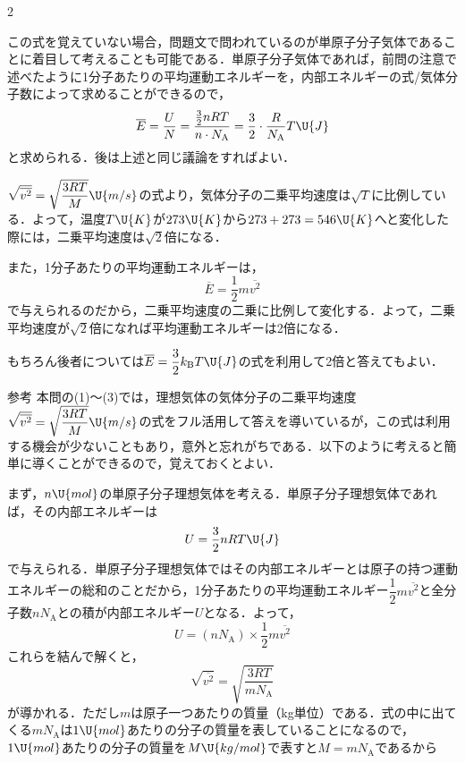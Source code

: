 \begin{multicols}{2}
\begin{bekkai}
\hspace*{1zw}この式を覚えていない場合，問題文で問われているのが単原子分子気体であることに着目して考えることも可能である．単原子分子気体であれば，前問の注意で述べたように1分子あたりの平均運動エネルギーを，内部エネルギーの式/気体分子数によって求めることができるので，
\[\overline{E}=\frac{U}{N}=\frac{\frac{3}{2}nRT}{n\cdot N_{\mathrm{A}}}=\frac{3}{2}\cdot\frac{R}{N_{\mathrm{A}}}T\U{J}\]
と求められる．後は上述と同じ議論をすればよい．
\end{bekkai}
\begin{komon}
 $\sqrt{\overline{v^2}}=\sqrt{\dfrac{3RT}{M}}\U{m/s}$の式より，気体分子の二乗平均速度は$\sqrt{T}$に比例している．よって，温度$T\U{K}$が$273\U{K}$から$273+273=546\U{K}$へと変化した際には，二乗平均速度は$\sqrt{2}$倍になる．\Ans\par
       \hspace*{1zw}また，1分子あたりの平均運動エネルギーは，
       \[\overline{E}=\frac{1}{2}m\overline{v^2}\]
       で与えられるのだから，二乗平均速度の二乗に比例して変化する．よって，二乗平均速度が$\sqrt{2}$倍になれば平均運動エネルギーは2倍になる．\Ans
\end{komon}
\begin{bekkai}
もちろん後者については$\overline{E}=\dfrac{3}{2}k_{\mathrm{B}}T\U{J}$の式を利用して2倍と答えてもよい．
\end{bekkai}
\begin{bsHosoku}{参考}
本問の(1)〜(3)では，理想気体の気体分子の二乗平均速度$\sqrt{\overline{v^2}}=\sqrt{\dfrac{3RT}{M}}\U{m/s}$の式をフル活用して答えを導いているが，この式は利用する機会が少ないこともあり，意外と忘れがちである．以下のように考えると簡単に導くことができるので，覚えておくとよい．\par
\hspace*{1zw}まず，$n\U{mol}$の単原子分子理想気体を考える．単原子分子理想気体であれば，その内部エネルギーは
\[U=\frac{3}{2}nRT\U{J}\]
で与えられる．単原子分子理想気体ではその内部エネルギーとは原子の持つ運動エネルギーの総和のことだから，1分子あたりの平均運動エネルギー$\dfrac{1}{2}m\overline{v^2}$と全分子数$nN_{\mathrm{A}}$との積が内部エネルギー$U$となる．よって，
\[U=(nN_{\mathrm{A}})\times\frac{1}{2}m\overline{v^2}\]
\hspace*{1zw}これらを結んで解くと，
\[\sqrt{\overline{v^2}}=\sqrt{\frac{3RT}{mN_{\mathrm{A}}}}\]
が導かれる．ただし$m$は原子一つあたりの質量（{\gtfamily kg}単位）である．式の中に出てくる$mN_{\mathrm{A}}$は$1\U{mol}$あたりの分子の質量を表していることになるので，$1\U{mol}$あたりの分子の質量を$M\U{kg/mol}$で表すと$M=mN_{\mathrm{A}}$であるから

\end{bsHosoku}
\end{multicols}
